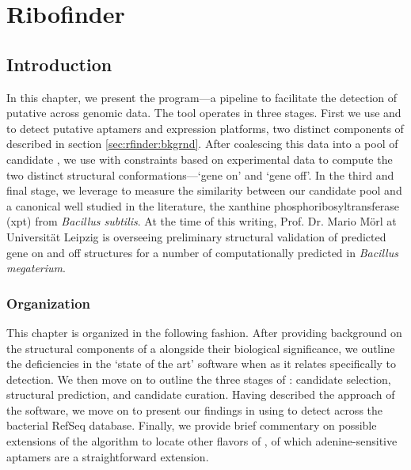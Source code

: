 
\newcommand{\fnaRetrievalTime}{\formatdate{25}{11}{2014} at \formattime{9}{14}{0}}

\chapter{Ribofinder}
\label{ch:rfinder}


\section{Introduction}
\label{sec:rfinder:intro}

In this chapter, we present the \rfinder program---a pipeline to facilitate the
detection of putative \grbs across genomic data. The \rfinder
tool operates in three stages. First we use \infernal
\citep{infernal,nawrocki:2013hk} and \tthp \citep{ermolaeva:2000cl} to detect
putative aptamers and expression platforms, two distinct components of
\rbs described in section \ref{sec:rfinder:bkgrnd}. After coalescing
this data into a pool of candidate \rbs, we use \rfold \citep{lorenz.amb11}
with constraints based on experimental data to compute the two distinct structural
conformations---`gene on' and `gene off'. In the third and final stage, we
leverage \foldalign \citep{havgaard:2007ca} to measure the similarity between our
candidate pool and a
canonical \grb well studied in the literature, the
xanthine phosphoribosyltransferase (xpt) \grb from {\em Bacillus subtilis}. At the
time of this writing, Prof. Dr. Mario
M\"orl at Universit\"at Leipzig is overseeing preliminary structural
validation of predicted gene on and off structures for a number of
computationally predicted \grbs in {\em Bacillus megaterium}.

\subsection{Organization}
\label{subsec:rfinder:org}

This chapter is organized in the following fashion. After providing background
on the structural components of a \rb alongside their biological
significance, we outline the deficiencies in the `state of the art' software
when as it relates specifically to \rb detection. We then move on to outline
the three stages of \rfinder: candidate selection, structural prediction, and
candidate curation. Having described the approach of the software, we move on
to present our findings in using \rfinder to detect \grbs across
the bacterial RefSeq database. Finally, we provide brief commentary on possible
extensions of the algorithm to locate other flavors of \rbs, of which
adenine-sensitive aptamers are a straightforward extension.

